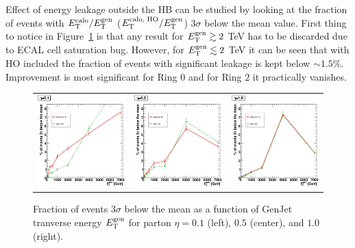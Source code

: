 \documentclass{cmspaper}
\begin{document}
Effect of energy leakage outside the HB can be studied by looking at the fraction of events with $E^\text{calo}_\text T/E^\text{gen}_\text T$ ($E^\text{calo, HO}_\text T/E^\text{gen}_\text T$) $3\sigma$ below the mean value. First thing to notice in Figure~\ref{fig:3sigma} is that any result for $E^\text{gen}_\text T\gtrsim2$ TeV has to be discarded due to ECAL cell saturation bug. However, for $E^\text{gen}_\text T\lesssim2$ TeV it can be seen that with HO included the 
fraction of events with significant leakage is kept below $\sim1.5\%$. Improvement is most significant for Ring $0$ and for Ring $2$ it practically vanishes. 
\begin{figure}
 \centering
 \begin{tabular}{lll}
  \includegraphics[width=2in]{figs/P3sigma_corr_eta0.1.eps} &
  \includegraphics[width=2in]{figs/P3sigma_corr_eta0.5.eps} &
  \includegraphics[width=2in]{figs/P3sigma_corr_eta1.0.eps} \\
 \end{tabular}
 \caption{Fraction of events $3\sigma$ below the mean as a function of GenJet tranverse energy $E^\text{gen}_\text T$ for parton $\eta=0.1$ (left), $0.5$ (center), and $1.0$ (right).}
 \label{fig:3sigma}
\end{figure}
\end{document}
